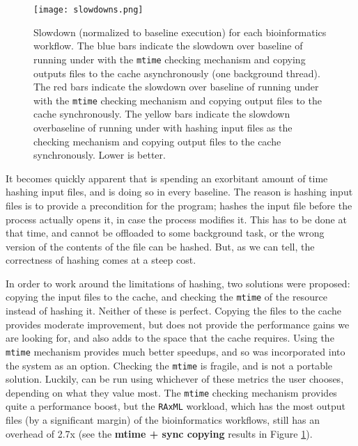 \begin{figure}[ht]
\centering
\texttt{[image: slowdowns.png]}
\caption{\label{fig:pc_slowdowns} Slowdown (normalized to baseline execution) for each bioinformatics workflow. The blue bars indicate the slowdown over baseline of running under \pc with the \texttt{mtime} checking mechanism and copying outputs files to the cache asynchronously (one background thread). The red bars indicate the slowdown over baseline of running under \pc with the \texttt{mtime} checking mechanism and copying output files to the cache synchronously. The yellow bars indicate the slowdown overbaseline of running under \pc with hashing input files as the checking mechanism and copying output files to the cache synchronously. Lower is better.}
\end{figure}

It becomes quickly apparent that \pc is spending an exorbitant amount of time hashing input files, and is doing so in every baseline. The reason \pc is hashing input files is to provide a precondition for the program; \pc  hashes the input file before the process actually opens it, in case the process modifies it. This has to be done at that time, and cannot be offloaded to some background task, or the wrong version of the contents of the file can be hashed. But, as we can tell, the correctness of hashing comes at a steep cost.

In order to work around the limitations of hashing, two solutions were proposed: copying the input files to the cache, and checking the \texttt{mtime} of the resource instead of hashing it. Neither of these is perfect. Copying the files to the cache provides moderate improvement, but does not provide the performance gains we are looking for, and also adds to the space that the cache requires. Using the \texttt{mtime} mechanism provides much better speedups, and so was incorporated into the system as an option. Checking the \texttt{mtime} is fragile, and is not a portable solution. Luckily, \pc can be run using whichever of these metrics the user chooses, depending on what they value most. The \texttt{mtime} checking mechanism provides quite a performance boost, but the \texttt{RAxML} workload, which has the most output files (by a significant margin) of the bioinformatics workflows, still has an overhead of 2.7x (see the \textbf{mtime + sync copying} results in Figure \ref{fig:pc_slowdowns}).

